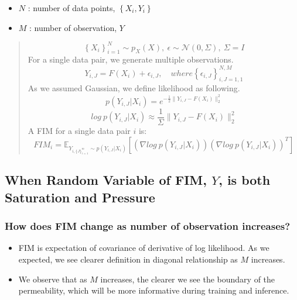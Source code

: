 \documentclass[
]{article}
\providecommand{\tightlist}{%
  \setlength{\itemsep}{0pt}\setlength{\parskip}{0pt}}\usepackage{longtable,booktabs,array}
\begin{document}
\begin{itemize}
\tightlist
\item
  \(N\) : number of data points, \(\left\{X_i, Y_i \right\}\)
\item
  \(M\) : number of observation, \(Y\)
\end{itemize}

\begin{quote}
\[ \left\{ X_i \right\}^N_{i=1} \sim p_X(X), \: \epsilon \sim \mathcal{N}(0, \Sigma), \: \Sigma = I
\] For a single data pair, we generate multiple observations.
\[Y_{i, J} = F(X_i) + \epsilon_{i, J}, \quad where \left\{ \epsilon_{i,J}\right\}^{N,M}_{i,J= 1,1}\]
As we assumed Gaussian, we define likelihood as following.
\[p(Y_{i,J}|X_i) = e^{-\frac{1}{2}\|Y_{i,J}-F(X_i)\|^2_2}\]
\[log \: p(Y_{i,J}|X_i) \approx \frac{1}{\Sigma}\|Y_{i,J}-F(X_i)\|^2_2\]
A FIM for a single data pair \(i\) is:
\[FIM_i = \mathbb{E}_{Y_{i, \{J\}^m_{i=1}} \sim p(Y_{i,J}|X_i)} \left[ \left(\nabla log \: p(Y_{i,J}|X_i)\right)\left(\nabla log \: p(Y_{i,J}|X_i)\right)^T\right]\]
\end{quote}

\subsection{\texorpdfstring{When Random Variable of FIM, \(Y\), is both
Saturation and
Pressure}{When Random Variable of FIM, Y, is both Saturation and Pressure}}\label{when-random-variable-of-fim-y-is-both-saturation-and-pressure}

\subsubsection{How does FIM change as number of observation
increases?}\label{how-does-fim-change-as-number-of-observation-increases}

\begin{itemize}
\tightlist
\item
  FIM is expectation of covariance of derivative of log likelihood. As
  we expected, we see clearer definition in diagonal relationship as
  \(M\) increases.
\item
  We observe that as \(M\) increases, the clearer we see the boundary of
  the permeability, which will be more informative during training and
  inference. 
\end{itemize}
\end{document}
